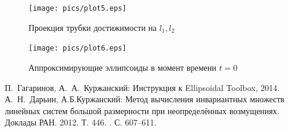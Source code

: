\documentclass[12pt]{article}
\theoremstyle{rusdef}
\begin{document}
\begin{figure}[p]
	\centering
	\texttt{[image: pics/plot5.eps]}
	\caption{Проекция трубки достижимости на $l_1, l_2$}
	\label{pic3_1}
\end{figure}

\begin{figure}[p]
	\centering
	\texttt{[image: pics/plot6.eps]}
	\caption{Аппроксимирующие эллипсоиды в момент времени $t = 0$}
	\label{pic3_2}
\end{figure}

\newpage
\begin{thebibliography}{99}
	 П.~Гагаринов, А.~А.~Куржанский: Инструкция к Ellipsoidal Toolbox, 2014.
	 А.~Н.~Дарьин, А.Б.Куржанский: Метод вычисления инвариантных множеств линейных систем большой размерности при неопределённых возмущениях. Доклады РАН. 2012. Т. 446. . С. 607–611.
\end{thebibliography}
\end{document}
